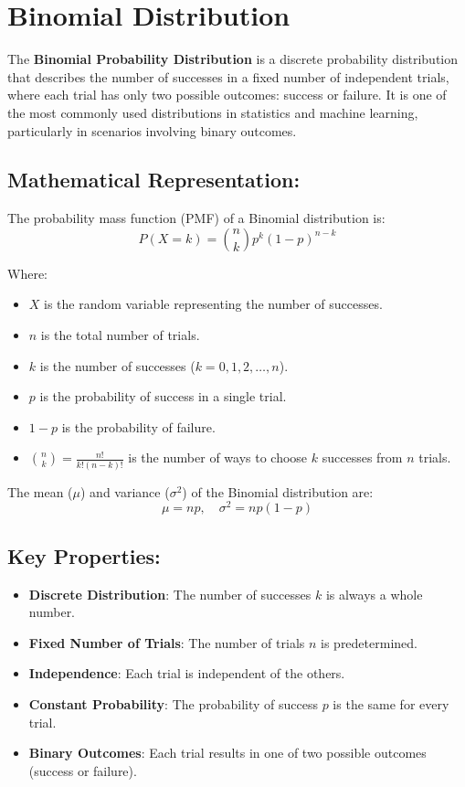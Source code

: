 \section{Binomial Distribution}
The \textbf{Binomial Probability Distribution} is a discrete probability distribution that describes the number of successes in a fixed number of independent trials, where each trial has only two possible outcomes: success or failure. It is one of the most commonly used distributions in statistics and machine learning, particularly in scenarios involving binary outcomes.

\subsection*{Mathematical Representation:}
The probability mass function (PMF) of a Binomial distribution is:
\[
    P(X = k) = \binom{n}{k} p^k {(1 - p)}^{n - k}
\]

Where:
\begin{itemize}
    \item $X$ is the random variable representing the number of successes.
    \item $n$ is the total number of trials.
    \item $k$ is the number of successes ($k = 0, 1, 2, \dots, n$).
    \item $p$ is the probability of success in a single trial.
    \item $1 - p$ is the probability of failure.
    \item $\binom{n}{k} = \frac{n!}{k!(n-k)!}$ is the number of ways to choose $k$ successes from $n$ trials.
\end{itemize}

The mean ($\mu$) and variance ($\sigma^2$) of the Binomial distribution are:
\[
    \mu = np, \quad \sigma^2 = np(1-p)
\]

\subsection*{Key Properties:}
\begin{itemize}
    \item \textbf{Discrete Distribution}: The number of successes $k$ is always a whole number.
    \item \textbf{Fixed Number of Trials}: The number of trials $n$ is predetermined.
    \item \textbf{Independence}: Each trial is independent of the others.
    \item \textbf{Constant Probability}: The probability of success $p$ is the same for every trial.
    \item \textbf{Binary Outcomes}: Each trial results in one of two possible outcomes (success or failure).
\end{itemize}

